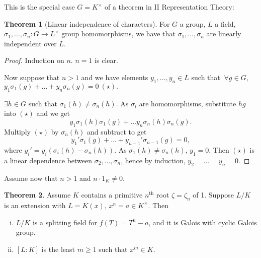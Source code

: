 \documentclass{article}
\theoremstyle{definition}
\newtheorem{theorem}{Theorem}[section]
\begin{document}
This is the special case $G=K^{\times}$ of a theorem in II Representation Theory:
\begin{theorem}[Linear independence of characters]
    For $G$ a group, $L$ a field, $\sigma_1,\ldots,\sigma_n : G \to L^{\times}$ group homomorphisms, we have that $\sigma_1,\ldots,\sigma_n$ are linearly independent over $L$.
\end{theorem}
\begin{proof}
    Induction on $n$. $n=1$ is clear.

    Now suppose that $n>1$ and we have elements $y_1,\ldots,y_n \in L$ such that $~\forall g \in G$, $y_1 \sigma_1(g) + \ldots + y_n \sigma_n(g) = 0 ~(\star).$ 

    $\exists h \in G$ such that $\sigma_1(h) \neq\sigma_n(h)$. As $\sigma_i$ are homomorphisms, substitute $hg$ into $(\star)$ and we get \[
    y_1 \sigma_1(h)\sigma_1(g) + \ldots y_n \sigma_n(h) \sigma_n(g).
    \]
    Multiply $(\star)$ by $\sigma_n(h)$ and subtract to get \[
    y_1' \sigma_1(g) + \ldots + y_{n-1}' \sigma_{n-1}(g) = 0,
    \]
    where $y_i'=y_i(\sigma_i(h)-\sigma_n(h))$. As $\sigma_1(h) \neq \sigma_n(h)$, $y_1=0$. Then $(\star)$ is a linear dependence between $\sigma_2,\ldots,\sigma_n$, hence by induction, $y_2=\ldots=y_n=0$.
\end{proof}
Assume now that $n>1$ and $n\cdot 1_K \neq 0$.
\begin{theorem}
    Assume $K$ contains a primitive $n^{\text{th}}$ root $\zeta=\zeta_n$ of 1. Suppose $L/K$ is an extension with $L=K(x)$, $x^n=a \in K^{\times}$. Then
    \begin{enumerate}[(i)]
        \item $L/K$ is a splitting field for $f(T)=T^n-a$, and it is Galois with cyclic Galois group.
        \item $[L:K]$ is the least $m\ge 1$ such that $x^m \in K$.
    \end{enumerate}
\end{theorem}
\end{document}
